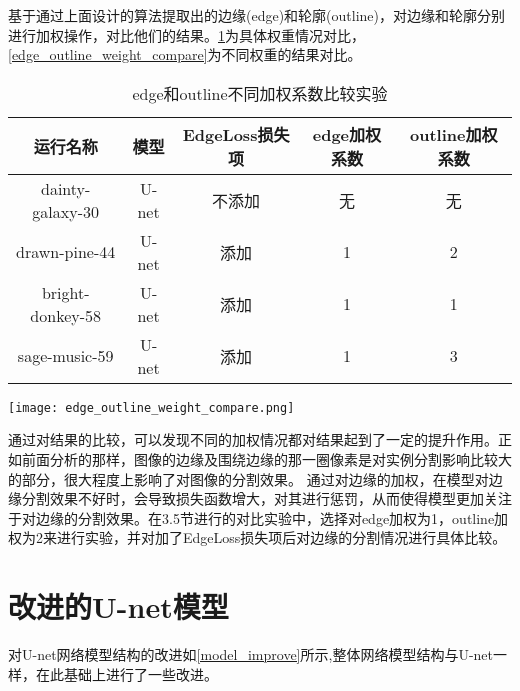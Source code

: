 \documentclass[AutoFakeBold]{LZUThesis}
\begin{document}
基于通过上面设计的算法提取出的边缘(edge)和轮廓(outline)，对边缘和轮廓分别进行加权操作，对比他们的结果。\cref{edge_outline_weight}为具体权重情况对比，\cref{edge_outline_weight_compare}为不同权重的结果对比。\par
\begin{table}[htbp] %
    \setlength{\abovecaptionskip}{0cm}
    \setlength{\belowcaptionskip}{0.2cm}
    \centering
    \caption{edge和outline不同加权系数比较实验}
    \label{edge_outline_weight}
    \begin{tabular}{|c|c|c|c|c|}
        \hline
        运行名称         & 模型  & EdgeLoss损失项 & edge加权系数 & outline加权系数 \\
        \hline
        dainty-galaxy-30 & U-net & 不添加         & 无           & 无              \\
        \hline
        drawn-pine-44    & U-net & 添加           & 1            & 2               \\
        \hline
        bright-donkey-58 & U-net & 添加           & 1            & 1               \\
        \hline
        sage-music-59    & U-net & 添加           & 1            & 3               \\
        \hline
    \end{tabular}
\end{table}
\begin{figure*}[htbp]
    \centering
    \texttt{[image: edge\_outline\_weight\_compare.png]}
    \caption{edge和outline不同加权系数结果比较}
    \label{edge_outline_weight_compare}
\end{figure*}
通过对结果的比较，可以发现不同的加权情况都对结果起到了一定的提升作用。正如前面分析的那样，图像的边缘及围绕边缘的那一圈像素是对实例分割影响比较大的部分，很大程度上影响了对图像的分割效果。
通过对边缘的加权，在模型对边缘分割效果不好时，会导致损失函数增大，对其进行惩罚，从而使得模型更加关注于对边缘的分割效果。在3.5节进行的对比实验中，选择对edge加权为1，outline加权为2来进行实验，并对加了EdgeLoss损失项后对边缘的分割情况进行具体比较。


\section{改进的U-net模型}
对U-net网络模型结构的改进如\cref{model_improve}所示,整体网络模型结构与U-net一样，在此基础上进行了一些改进。
\end{document}
